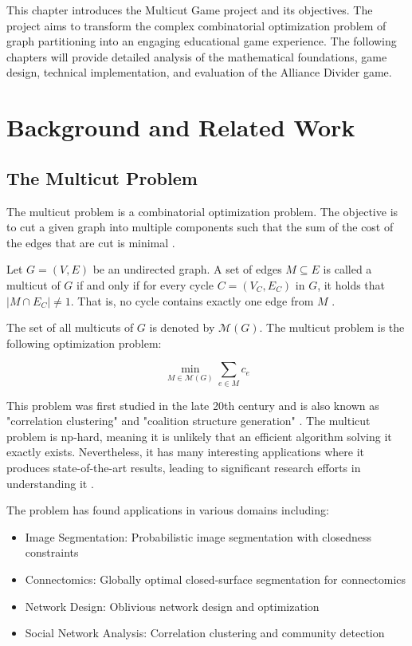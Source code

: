 \documentclass[english]{tudscrreprt}
\begin{document}
This chapter introduces the Multicut Game project and its objectives. The project aims to transform the complex combinatorial optimization problem of graph partitioning into an engaging educational game experience. The following chapters will provide detailed analysis of the mathematical foundations, game design, technical implementation, and evaluation of the Alliance Divider game.

\chapter{Background and Related Work}

\section{The Multicut Problem}
The multicut problem is a combinatorial optimization problem. The objective is to cut a given graph into multiple components such that the sum of the cost of the edges that are cut is minimal \cite{schrijver2003}.

Let $G = (V, E)$ be an undirected graph. A set of edges $M \subseteq E$ is called a multicut of $G$ if and only if for every cycle $C = (V_C, E_C)$ in $G$, it holds that $|M \cap E_C| \ne 1$. That is, no cycle contains exactly one edge from $M$ \cite{garg1997}.

The set of all multicuts of $G$ is denoted by $\mathcal{M}(G)$. The multicut problem is the following optimization problem:

\[
\min_{M \in \mathcal{M}(G)} \sum_{e \in M} c_e
\]

This problem was first studied in the late 20th century and is also known as "correlation clustering" \cite{bansal2004} and "coalition structure generation" \cite{demaine2006}. The multicut problem is \gls{np}-hard, meaning it is unlikely that an efficient algorithm solving it exactly exists. Nevertheless, it has many interesting applications where it produces state-of-the-art results, leading to significant research efforts in understanding it \cite{calinescu2000}.

The problem has found applications in various domains including:
\begin{itemize}
  \item Image Segmentation: Probabilistic image segmentation with closedness constraints \cite{andres2012a}
  \item Connectomics: Globally optimal closed-surface segmentation for connectomics \cite{andres2012b}
  \item Network Design: Oblivious network design and optimization \cite{gupta2004}
  \item Social Network Analysis: Correlation clustering and community detection \cite{charikar2005}
\end{itemize}
\end{document}

